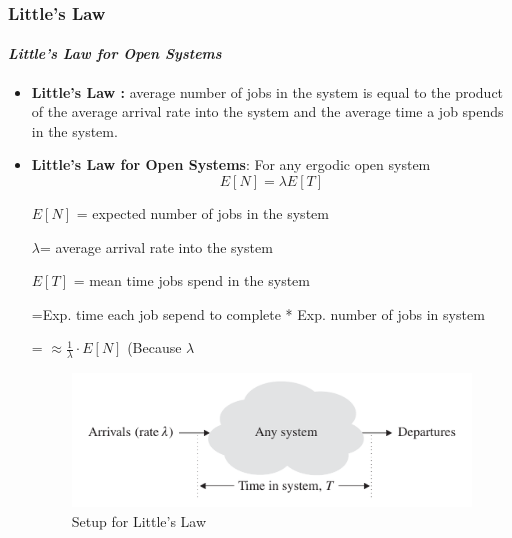 \documentclass{beamer}
\begin{document}
\begin{frame}
\frametitle{Little’s Law}
\framesubtitle{\textbf{\textit{Little’s Law for Open Systems}}}
\begin{itemize}
\item \textbf{Little’s Law :}  average number of jobs in the system is equal to the product of the average arrival
rate into the system and the average time a job spends in the system.

\item \textbf{Little’s Law for Open Systems}: For any ergodic open system
$$E [N ] = \lambda E [T ]$$

$E [N ]$ = expected number of jobs in the system

$ \lambda$= average arrival rate into the system

$E [T ]$ =  mean time jobs spend in the system 

=Exp. time each job sepend to complete * Exp. number of jobs in system 

= $ \approx \frac{1}{\lambda} \cdot E[N]$  (Because $\lambda$


\begin{figure}
\includegraphics[scale=0.2]{images/setup_for_little_law.jpeg}
\caption{Setup for Little’s Law}
\end{figure}

\end{itemize}
	
\end{frame}
\end{document}
